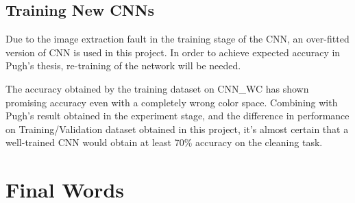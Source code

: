 \documentclass[bsc,logo,twoside,fullspacing,parskip]{infthesis}
\begin{document}
\subsection{Training New CNNs}

Due to the image extraction fault in the training stage of the CNN, an over-fitted version of CNN is used in this project. 
In order to achieve expected accuracy in Pugh's thesis\cite{Pugh}, re-training of the network will be needed.

The accuracy obtained by the training dataset on CNN\_WC has shown promising accuracy even with a completely wrong color space. Combining with Pugh's result obtained in the experiment stage, and the difference in performance on Training/Validation dataset obtained in this project, it's almost certain that a well-trained CNN would obtain at least 70\% accuracy on the cleaning task. 

\section{Final Words}




\end{document}
